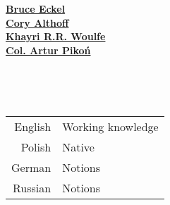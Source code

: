 \begin{leftcolumn*}
{{\begin{minipage}[l]{0.9\leftcolwidth}
                    {\href{https://www.linkedin.com/in/bruceeckel/}{\textbf{Bruce Eckel}}}
                \vspace{\itemspace}\\
                    {\href{https://www.linkedin.com/in/calthoff/}{\textbf{Cory Althoff}}}
                \vspace{\itemspace}\\
                    {\href{https://www.linkedin.com/in/krrw/}{\textbf{Khayri R.R. Woulfe}}}
                \vspace{\itemspace}\\
                    {\href{https://archiwum2019-10bkpanc.wp.mil.pl/pl/11.html}{\textbf{Col. Artur Pikoń}}}
                \vspace{\itemspace}\\
            \end{minipage} %
        }%
    } %
    \vspace{\itemspace}\\ 
    {\color{white} 
        \phantom{} \\ %
        \begin{minipage}[r]{\leftcolwidth}
            \begin{tabular}{r|l}
                English & Working knowledge\\[0.3em]
                Polish & Native\\[0.3em]
                German & Notions\\[0.3em]
                Russian & Notions
            \end{tabular}
        \end{minipage} %
    } %
    \end{leftcolumn*}
